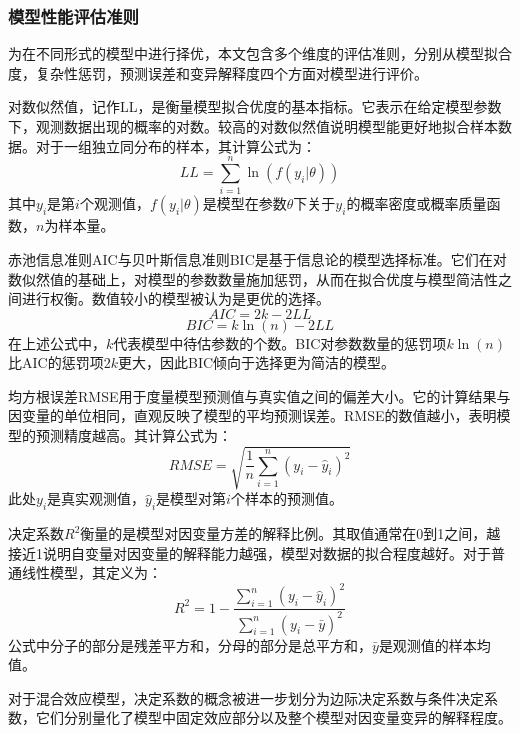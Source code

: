 \subsubsection{模型性能评估准则}


为在不同形式的模型中进行择优，本文包含多个维度的评估准则，分别从模型拟合度，复杂性惩罚，预测误差和变异解释度四个方面对模型进行评价。

对数似然值，记作LL，是衡量模型拟合优度的基本指标。它表示在给定模型参数下，观测数据出现的概率的对数。较高的对数似然值说明模型能更好地拟合样本数据。对于一组独立同分布的样本，其计算公式为：
\begin{equation}
LL = \sum_{i=1}^{n} \ln(f(y_i|\theta))
\end{equation}
其中$y_i$是第$i$个观测值，$f(y_i|\theta)$是模型在参数$\theta$下关于$y_i$的概率密度或概率质量函数，$n$为样本量。

赤池信息准则AIC与贝叶斯信息准则BIC是基于信息论的模型选择标准。它们在对数似然值的基础上，对模型的参数数量施加惩罚，从而在拟合优度与模型简洁性之间进行权衡。数值较小的模型被认为是更优的选择。
\begin{equation}
AIC = 2k - 2LL
\end{equation}
\begin{equation}
BIC = k \ln(n) - 2LL
\end{equation}
在上述公式中，$k$代表模型中待估参数的个数。BIC对参数数量的惩罚项$k \ln(n)$比AIC的惩罚项$2k$更大，因此BIC倾向于选择更为简洁的模型。

均方根误差RMSE用于度量模型预测值与真实值之间的偏差大小。它的计算结果与因变量的单位相同，直观反映了模型的平均预测误差。RMSE的数值越小，表明模型的预测精度越高。其计算公式为：
\begin{equation}
RMSE = \sqrt{\frac{1}{n}\sum_{i=1}^{n}(y_i - \hat{y}_i)^2}
\end{equation}
此处$y_i$是真实观测值，$\hat{y}_i$是模型对第$i$个样本的预测值。

决定系数$R^2$衡量的是模型对因变量方差的解释比例。其取值通常在0到1之间，越接近1说明自变量对因变量的解释能力越强，模型对数据的拟合程度越好。对于普通线性模型，其定义为：
\begin{equation}
R^2 = 1 - \frac{\sum_{i=1}^{n}(y_i - \hat{y}_i)^2}{\sum_{i=1}^{n}(y_i - \bar{y})^2}
\end{equation}
公式中分子的部分是残差平方和，分母的部分是总平方和，$\bar{y}$是观测值的样本均值。

对于混合效应模型，决定系数的概念被进一步划分为边际决定系数与条件决定系数，它们分别量化了模型中固定效应部分以及整个模型对因变量变异的解释程度。

